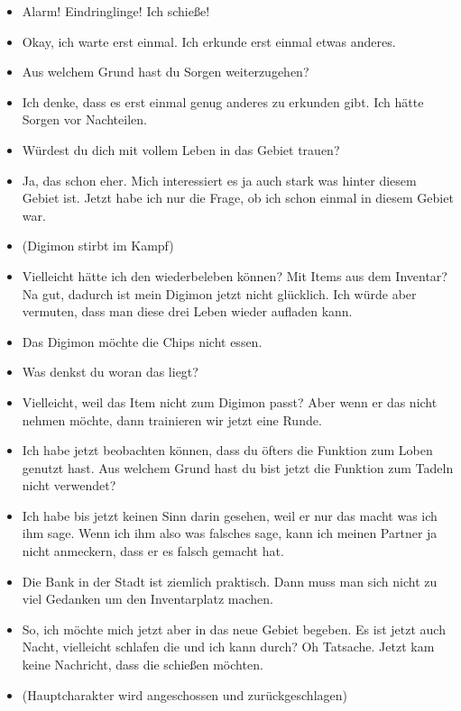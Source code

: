 {\begin{itemize}[]
    \item {} \frq  Alarm! Eindringlinge! Ich schieße!\flq{}%
    \item {} Okay, ich warte erst einmal. Ich erkunde erst einmal etwas anderes.
    \item {} Aus welchem Grund hast du Sorgen weiterzugehen?
    \item {} Ich denke, dass es erst einmal genug anderes zu erkunden gibt. Ich hätte Sorgen vor Nachteilen.
    \item {} Würdest du dich mit vollem Leben in das Gebiet trauen?
    \item {} Ja, das schon eher. Mich interessiert es ja auch stark was hinter diesem Gebiet ist. Jetzt habe ich nur die Frage, ob ich schon einmal in diesem Gebiet war.
    \item {} (Digimon stirbt im Kampf)
    \item {} Vielleicht hätte ich den wiederbeleben können? Mit Items aus dem Inventar? Na gut, dadurch ist mein Digimon jetzt nicht glücklich. Ich würde aber vermuten, dass man diese drei Leben wieder aufladen kann. 
    \item {} Das Digimon möchte die Chips nicht essen. 
    \item {} Was denkst du woran das liegt?
    \item {} Vielleicht, weil das Item nicht zum Digimon passt? Aber wenn er das nicht nehmen möchte, dann trainieren wir jetzt eine Runde. 
    \item {} Ich habe jetzt beobachten können, dass du öfters die Funktion zum Loben genutzt hast. Aus welchem Grund hast du bist jetzt die Funktion zum Tadeln nicht verwendet?
    \item {} Ich habe bis jetzt keinen Sinn darin gesehen, weil er nur das macht was ich ihm sage. Wenn ich ihm also was falsches sage, kann ich meinen Partner ja nicht anmeckern, dass er es falsch gemacht hat.
    \item {} Die Bank in der Stadt ist ziemlich praktisch. Dann muss man sich nicht zu viel Gedanken um den Inventarplatz machen. 
    \item {} So, ich möchte mich jetzt aber in das neue Gebiet begeben. Es ist jetzt auch Nacht, vielleicht schlafen die und ich kann durch? Oh Tatsache. Jetzt kam keine Nachricht, dass die schießen möchten.
    \item {} (Hauptcharakter wird angeschossen und zurückgeschlagen)

\end{itemize}}
